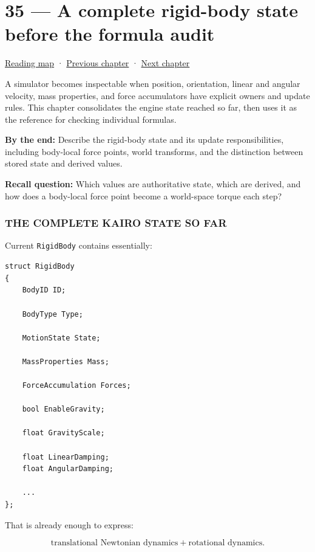 \hypertarget{06-engine-ii-ch035}{}
\section{35 --- A complete rigid-body state before the formula audit}\label{a-complete-rigid-body-state-before-the-formula-audit}

\href{Chapter\%20Edition/03\%20-\%20Game\%20Engine/00\%20-\%20Reading\%20Map}{Reading map} · \hyperref[06-engine-ii-ch034]{Previous chapter} · \hyperref[06-engine-ii-ch036]{Next chapter}

A simulator becomes inspectable when position, orientation, linear and angular velocity, mass properties, and force accumulators have explicit owners and update rules. This chapter consolidates the engine state reached so far, then uses it as the reference for checking individual formulas.

\textbf{By the end:} Describe the rigid-body state and its update responsibilities, including body-local force points, world transforms, and the distinction between stored state and derived values.

\textbf{Recall question:} Which values are authoritative state, which are derived, and how does a body-local force point become a world-space torque each step?

\subsubsection{THE COMPLETE KAIRO STATE SO FAR}\label{the-complete-kairo-state-so-far}

Current \texttt{RigidBody} contains essentially:

\begin{verbatim}
struct RigidBody
{
    BodyID ID;

    BodyType Type;

    MotionState State;

    MassProperties Mass;

    ForceAccumulation Forces;

    bool EnableGravity;

    float GravityScale;

    float LinearDamping;
    float AngularDamping;

    ...
};
\end{verbatim}

That is already enough to express:

\[
\boxed{
\text{translational Newtonian dynamics}
+
\text{rotational dynamics}.
}
\]


